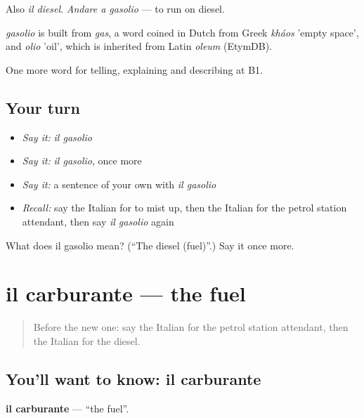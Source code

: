 Also \emph{il diesel}. \emph{Andare a gasolio} — to run on diesel.

\begin{cousinweb}
\emph{gasolio} is built from \emph{gas}, a word coined in Dutch from Greek \emph{kháos} 'empty space', and \emph{olio} 'oil', which is inherited from Latin \emph{oleum} (EtymDB).
\end{cousinweb}

\begin{grammarlens}[title={What you've built}]
One more word for telling, explaining and describing at B1.
\end{grammarlens}

\subsection*{Your turn}
\begin{itemize}
\raggedright
  \item \emph{Say it:} \emph{il gasolio}
  \item \emph{Say it:} \emph{il gasolio}, once more
  \item \emph{Say it:} a sentence of your own with \emph{il gasolio}
  \item \emph{Recall:} say the Italian for to mist up, then the Italian for the petrol station attendant, then say \emph{il gasolio} again
\end{itemize}

\begin{tcolorbox}[breakable,colback=teal!4,colframe=teal!35!black,title={Before you move on}]
What does il gasolio mean? (\textquotedblleft{}The diesel (fuel)\textquotedblright{}.) Say it once more.
\end{tcolorbox}
\section[il carburante]{il carburante — the fuel}

\label{lesson:IT-C408-carburante}



\begin{quote}
Before the new one: say the Italian for the petrol station attendant, then the Italian for the diesel.
\end{quote}

\subsection*{You'll want to know: il carburante}
\textbf{il carburante} — \textquotedblleft{}the fuel\textquotedblright{}.

